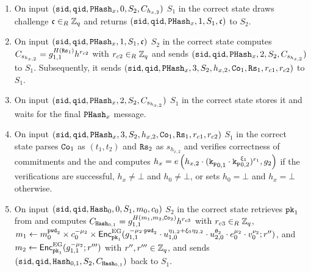 \begin{enumerate}
    
	    \item On input $(\mathtt{sid},\mathtt{qid},\mathtt{PHash}_x,0,S_2,C_{h_{x,2}})$ $S_1$ in the correct state draws challenge $\mathfrak{c}\in_R\mathbb{Z}_q$ and returns $(\mathtt{sid},\mathtt{qid},\mathtt{PHash}_x,1,S_1,\mathfrak{c})$ to $S_2$.
	    
	    \item On input $(\mathtt{sid},\mathtt{qid},\mathtt{PHash}_x,1,S_1,\mathfrak{c})$ $S_2$ in the correct state computes
	    $C_{s_{h_{x,2}}}=g_{1,1}^{H(\mathtt{Rs}_{1})} h^{r_{c2}}$ with $r_{c2}\in_R\mathbb{Z}_q$
	    and sends $(\mathtt{sid},\mathtt{qid},\mathtt{PHash}_x,2,S_2,C_{s_{h_{x,2}}})$ to $S_1$.
	    Subsequently, it sends $(\mathtt{sid},\mathtt{qid},\mathtt{PHash}_x,3,S_2,h_{x,2}, \mathtt{Co}_1, \mathtt{Rs}_1, r_{c1}, r_{c2})$ to $S_1$.
	    
	    \item On input $(\mathtt{sid},\mathtt{qid},\mathtt{PHash}_x,2,S_2,C_{s_{h_{x,2}}})$ $S_1$ in the correct state stores it and waits for the final $\mathtt{PHash}_x$ message.
	    
	    \item On input $(\mathtt{sid},\mathtt{qid},\mathtt{PHash}_x,3,S_2,h_{x,2}, \mathtt{Co}_1, \mathtt{Rs}_1, r_{c1}, r_{c2})$ $S_1$ in the correct state parses $\mathtt{Co}_1$ as $(t_1,t_2)$ and $\mathtt{Rs}_2$ as $s_{h_{x,2}}$ and verifies correctness of commitments and the \ZKP
	     and computes
 	    $h_x = e\left( h_{x,2}\cdot (\mathtt{k_p}_{0,1} \cdot \mathtt{k_p}_{0,2}^{\xi_1})^{r_1}, g_2 \right)$
 	    if the verifications are successful, $h_x\not=\bot$ and $h_0\not=\bot$, or sets $h_0=\bot$ and $h_x=\bot$ otherwise.
	    
	    
	    \item On input $(\mathtt{sid},\mathtt{qid},\mathtt{Hash}_0,0,S_1,m_0,c_0)$ $S_2$ in the correct state retrieves $\mathtt{pk}_1$ from \Fca and computes
	      $C_{\mathtt{Hash}_{0,1}}=g_{1,1}^{H(m_{1},m_{2},\mathtt{Co}_2)} h^{r_{c3}}$
	      with $r_{c3}\in_R\mathbb{Z}_q$,
	      $m_{1}\gets m_0^{\pwd_2} \times c_0^{-\mu_2} \times \Enc_{\pk_1}^\EG(g_{1,1}^{-\mu_2\cdot {\pwd_2}} \cdot u_{1,0}^{\eta_{1,2}+\xi_0\eta_{2,2}} \cdot u_{2,0}^{\theta_2} \cdot e_0^{\mu_2} \cdot v_0^{\nu_2}; r'')$, and $m_{2}\gets \mathsf{Enc}_{\mathtt{pk}_1}^\mathrm{EG}(g_{1,1}^{-\mu_2}; r''')$ with $r'',r'''\in\mathbb{Z}_q$,
	      and sends $(\mathtt{sid},\mathtt{qid},\mathtt{Hash}_{0,1},S_2,C_{\mathtt{Hash}_{0,1}})$ back to $S_1$.
	      

\end{enumerate}
